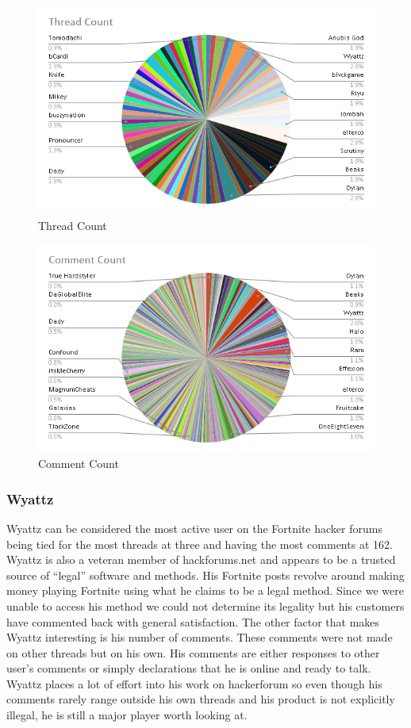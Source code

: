 \documentclass[sigconf]{acmart}
\begin{document}
\begin{figure}[h]
 	\centering
	\includegraphics[width = .5\linewidth]{ThreadCount.png}
	\caption{Thread Count}
\end{figure}
\begin{figure}[h]
 	\centering
	\includegraphics[width=.5\linewidth]{CommentCount.png}
	\caption{Comment Count}
\end{figure}


\subsubsection{Wyattz}
Wyattz can be considered the most active user on the Fortnite hacker forums being tied for the most threads at three and having the most comments at 162. Wyattz is also a veteran member of hackforums.net and appears to be a trusted source of “legal” software and methods. His Fortnite posts revolve around making money playing Fortnite using what he claims to be a legal method. Since we were unable to access his method we could not determine its legality but his customers have commented back with general satisfaction. The other factor that makes Wyattz interesting is his number of comments. These comments were not made on other threads but on his own. His comments are either responses to other user’s comments or simply declarations that he is online and ready to talk. Wyattz places a lot of effort into his work on hackerforum so even though his comments rarely range outside his own threads and his product is not explicitly illegal, he is still a major player worth looking at.
\end{document}
